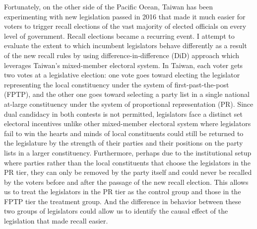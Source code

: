 \documentclass[crop=false]{standalone}
\begin{document}
	
	Fortunately, on the other side of the Pacific Ocean,
	Taiwan has been experimenting with new legislation passed in 2016 that made it much easier for voters to trigger recall elections of the vast majority of elected officials on every level of government.
	Recall elections became a recurring event.
	I attempt to evaluate the extent to which incumbent legislators behave differently as a result of the new recall rules by using difference-in-difference (DiD) approach which leverages Taiwan's mixed-member electoral system.
	In Taiwan, each voter gets two votes at a legislative election:
	one vote goes toward electing the legislator representing the local constituency under the system of first-past-the-post (FPTP),
	and the other one goes toward selecting a party list in a single national at-large constituency under the system of proportional representation (PR).
	Since dual candidacy in both contests is not permitted,
	legislators face a distinct set electoral incentives unlike other mixed-member electoral system where legislators fail to win the hearts and minds of local constituents could still be returned to the legislature by the strength of their parties and their positions on the party lists in a larger constituency.
	Furthermore, perhaps due to the institutional setup where parties rather than the local constituents that choose the legislators in the PR tier, they can only be removed by the party itself and could never be recalled by the voters before and after the passage of the new recall election.
	This allows us to treat the legislators in the PR tier as the control group and those in the FPTP tier the treatment group.
	And the difference in behavior between these two groups of legislators could allow us to identify the causal effect of the legislation that made recall easier.

	
	
\end{document}
